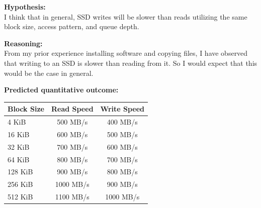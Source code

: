 \documentclass[11pt]{article}
\begin{document}
\begin{hypothesisbox}
	\textbf{Hypothesis:} \\

	I think that in general, SSD writes will be slower than reads utilizing the same block size, access pattern, and queue
	depth.

	\textbf{Reasoning:} \\
	From my prior experience installing software and copying files, I have observed that writing to an SSD is slower than
	reading from it. So I would expect that this would be the case in general.

	\textbf{Predicted quantitative outcome:} \\
	\begin{center}
		\label{tab:hypothesis-huge-pages}
		\begin{tabular}{lcc}
			\toprule
			\textbf{Block Size} & \textbf{Read Speed} & \textbf{Write Speed} \\
			\midrule
			4 KiB               & 500 MB/s            & 400 MB/s             \\
			16 KiB              & 600 MB/s            & 500 MB/s             \\
			32 KiB              & 700 MB/s            & 600 MB/s             \\
			64 KiB              & 800 MB/s            & 700 MB/s             \\
			128 KiB             & 900 MB/s            & 800 MB/s             \\
			256 KiB             & 1000 MB/s           & 900 MB/s             \\
			512 KiB             & 1100 MB/s           & 1000 MB/s            \\
			\bottomrule
		\end{tabular}
	\end{center}
\end{hypothesisbox}
\end{document}
